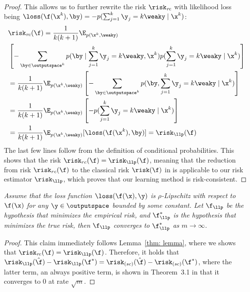 \documentclass{article}
\begin{document}
\begin{proof}
This allows us to further rewrite the risk $\risk_{\mathit{rc}}$ with likelihood loss being 
$\loss(\f(\x^k), \by) = - p(\sum_{j = 1}^k \y_j = k\weaky \mid \x^k)$:
\begin{align*}
    &\risk_{\mathit{rc}}
    (\f)
    = \frac{1}{k(k + 1)} \E_{p(\x^k, \weaky)} \\
    &\left[- \sum_{\by \in \outputspace^k} 
    p(\by \mid \sum_{j = 1}^k \y_j = k\weaky, \x^k)
    p(\sum_{j = 1}^k \y_j = k\weaky \mid \x^k) \right] \\
    &= \frac{1}{k(k + 1)} \E_{p(\x^k, \weaky)}
    \left[- \sum_{\by \in \outputspace^k} 
    p(\by, \sum_{j = 1}^k \y_j = k\weaky \mid \x^k) \right] \\
    &= \frac{1}{k(k + 1)} \E_{p(\x^k, \weaky)}
    \left[- p(\sum_{j = 1}^k \y_j = k\weaky \mid \x^k)\right] \\
    &= \frac{1}{k(k + 1)} \E_{p(\x^k, \weaky)} [\loss(\f(\x^k), \by)]
    = \risk_{\llp}(\f)
\end{align*}
The last few lines follow from the definition of conditional probabilities.
This shows that the risk $\risk_{rc}(\f) = \risk_{\llp}(\f)$, meaning that the reduction from risk $\risk_{rc}(\f)$ to the classical risk $\risk(\f)$ in \citet{kobayashi2022risk} is applicable to our risk estimator $\risk_{\llp}$,
which proves that our learning method is risk-consistent.
\end{proof}


\begin{proposition}
\emph{
Assume that the loss function $\loss(\f(\x), \y)$ is $\rho$-Lipschitz with respect to $\f(\x)$ for any $\y \in \outputspace$ bounded by some constant.
Let $\f_{\llp}$ be the hypothesis that minimizes the empirical risk, and $\f^*_{\llp}$ is the hypothesis that minimizes the true risk,
then $\f_{\llp}$ converges to $\f^*_{\llp}$ as $m \rightarrow \infty$.
}
\end{proposition}
\begin{proof}
This claim immediately follows Lemma~\ref{thm: lemma},
where we shows that $\risk_{\mathit{rc}}(\f) = \risk_{\llp}(\f)$.
Therefore, it holds that $\risk_{\llp}(\hat{\f}) - \risk_{\llp}(\f^*) = \risk_{\mathit(sc)}(\hat{\f}) - \risk_{\mathit(sc)}(\f^*)$,
where the latter term, an always positive term, is shown in Theorem~3.1 in \citet{kobayashi2022risk} that it converges to $0$ at rate $\sqrt{m}$.
\end{proof}
\end{document}
